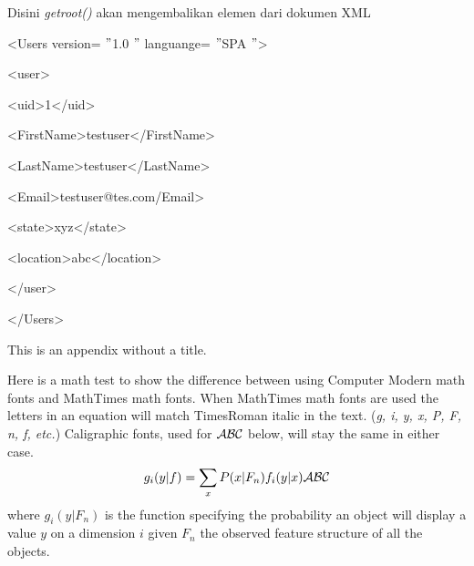 \documentclass{wileySix}
\begin{document}
\begin{myEnumerate}
{Disini \textit{getroot()} akan mengembalikan elemen dari dokumen XML \par
\vspace{10pt}
\noindent 
{\fontsize{10pt}{10pt}\selectfont <Users version= $ " $1.0 $ " $ languange= $ " $SPA $ " $>} \par
\noindent 
{\fontsize{10pt}{10pt}\selectfont  \hspace*{0.5in} <user>} \par
\noindent 
{\fontsize{10pt}{10pt}\selectfont  \hspace*{0.5in}  \hspace*{0.5in} <uid>1</uid>} \par
\noindent 
{\fontsize{10pt}{10pt}\selectfont  \hspace*{0.5in}  \hspace*{0.5in} <FirstName>testuser</FirstName>} \par
\noindent 
{\fontsize{10pt}{10pt}\selectfont  \hspace*{0.5in}  \hspace*{0.5in} <LastName>testuser</LastName>} \par
\noindent 
{\fontsize{10pt}{10pt}\selectfont  \hspace*{0.5in}  \hspace*{0.5in} <Email>testuser@tes.com/Email>} \par
\noindent 
{\fontsize{10pt}{10pt}\selectfont  \hspace*{0.5in}  \hspace*{0.5in} <state>xyz</state>} \par
\noindent 
{\fontsize{10pt}{10pt}\selectfont  \hspace*{0.5in}  \hspace*{0.5in} <location>abc</location>} \par
\noindent 
{\fontsize{10pt}{10pt}\selectfont  \hspace*{0.5in} </user>} \par
\noindent 
{\fontsize{10pt}{10pt}\selectfont </Users>} \par
\vspace{10pt}

\appendix{}
This is an appendix without a title.

Here is a math test to show the difference between using Computer Modern
math fonts and MathTimes math fonts. When MathTimes math fonts are used
the letters in an equation will match TimesRoman italic in the text.
({\it g, i, y, x, P, F, n, f, etc.}) Caligraphic fonts, used for
$\cal ABC$ below, will stay the same
in either case.
\begin{equation}
g_i(y|f)=\sum_x P(x|F_n)f_i(y|x){\cal ABC}
\end{equation}
where $g_i(y|F_n)$ is the function specifying the probability an object will
display a value $y$ on a dimension $i$ given $F_n$ the observed feature
structure of all the objects.


}
\end{myEnumerate}
\end{document}
